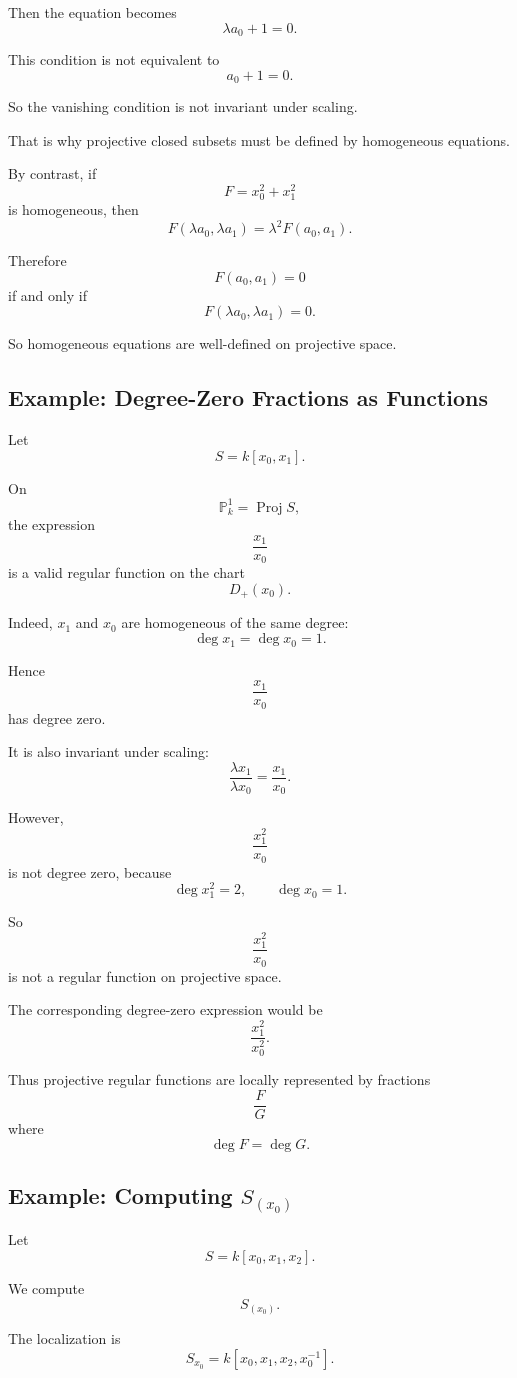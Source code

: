 \documentclass[12pt,a4paper]{article}
\DeclareMathOperator{\Proj}{Proj}
\newcommand{\PP}{\mathbb P}
\theoremstyle{notespace}
\begin{document}
Then the equation becomes
\[
\lambda a_0+1=0.
\]

This condition is not equivalent to
\[
a_0+1=0.
\]

So the vanishing condition is not invariant under scaling.

That is why projective closed subsets must be defined by homogeneous equations.

By contrast, if
\[
F=x_0^2+x_1^2
\]
is homogeneous, then
\[
F(\lambda a_0,\lambda a_1)
=
\lambda^2F(a_0,a_1).
\]

Therefore
\[
F(a_0,a_1)=0
\]
if and only if
\[
F(\lambda a_0,\lambda a_1)=0.
\]

So homogeneous equations are well-defined on projective space.

\subsection{Example: Degree-Zero Fractions as Functions}

Let
\[
S=k[x_0,x_1].
\]

On
\[
\PP_k^1=\Proj S,
\]
the expression
\[
\frac{x_1}{x_0}
\]
is a valid regular function on the chart
\[
D_+(x_0).
\]

Indeed, \(x_1\) and \(x_0\) are homogeneous of the same degree:
\[
\deg x_1=\deg x_0=1.
\]

Hence
\[
\frac{x_1}{x_0}
\]
has degree zero.

It is also invariant under scaling:
\[
\frac{\lambda x_1}{\lambda x_0}
=
\frac{x_1}{x_0}.
\]

However,
\[
\frac{x_1^2}{x_0}
\]
is not degree zero, because
\[
\deg x_1^2=2,
\qquad
\deg x_0=1.
\]

So
\[
\frac{x_1^2}{x_0}
\]
is not a regular function on projective space.

The corresponding degree-zero expression would be
\[
\frac{x_1^2}{x_0^2}.
\]

Thus projective regular functions are locally represented by fractions
\[
\frac{F}{G}
\]
where
\[
\deg F=\deg G.
\]

\subsection{Example: Computing \texorpdfstring{$S_{(x_0)}$}{S(x0)}}

Let
\[
S=k[x_0,x_1,x_2].
\]

We compute
\[
S_{(x_0)}.
\]

The localization is
\[
S_{x_0}
=
k[x_0,x_1,x_2,x_0^{-1}].
\]
\end{document}
